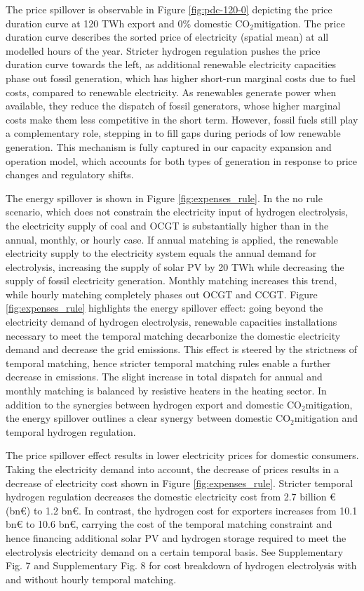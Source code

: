 \documentclass[5p,numafflabel]{elsarticle}
\newcommand{\co}{\ce{CO2}~}
\def\co{CO${}_2${\:}}
\begin{document}
The price spillover is observable in Figure \ref{fig:pdc-120-0} depicting the price duration curve at 120 TWh export and 0\% domestic \co mitigation. The price duration curve describes the sorted price of electricity (spatial mean) at all modelled hours of the year.
Stricter hydrogen regulation pushes the price duration curve towards the left, as additional renewable electricity capacities phase out fossil generation, which has higher short-run marginal costs due to fuel costs, compared to renewable electricity.
As renewables generate power when available, they reduce the dispatch of fossil generators, whose higher marginal costs make them less competitive in the short term. However, fossil fuels still play a complementary role, stepping in to fill gaps during periods of low renewable generation. This mechanism is fully captured in our capacity expansion and operation model, which accounts for both types of generation in response to price changes and regulatory shifts.


The energy spillover is shown in Figure \ref{fig:expenses_rule}. In the no rule scenario, which does not constrain the electricity input of hydrogen electrolysis, the electricity supply of coal and OCGT is substantially higher than in the annual, monthly, or hourly case. If annual matching is applied, the renewable electricity supply to the electricity system equals the annual demand for electrolysis, increasing the supply of solar PV by 20 TWh while decreasing the supply of fossil electricity generation. 
Monthly matching increases this trend, while hourly matching completely phases out OCGT and CCGT. Figure \ref{fig:expenses_rule} highlights the energy spillover effect: going beyond the electricity demand of hydrogen electrolysis, renewable capacities installations necessary to meet the temporal matching decarbonize the domestic electricity demand and decrease the grid emissions. This effect is steered by the strictness of temporal matching, hence stricter temporal matching rules enable a further decrease in emissions.
The slight increase in total dispatch for annual and monthly matching is balanced by resistive heaters in the heating sector.
In addition to the synergies between hydrogen export and domestic \co mitigation, the energy spillover outlines a clear synergy between domestic \co mitigation and temporal hydrogen regulation.



The price spillover effect results in lower electricity prices for domestic consumers. Taking the electricity demand into account, the decrease of prices results in a decrease of electricity cost shown in 
Figure \ref{fig:expenses_rule}. Stricter temporal hydrogen regulation decreases the domestic electricity cost from 2.7 billion € (bn€) to 1.2 bn€. In contrast, the hydrogen cost for exporters increases from 10.1 bn€ to 10.6 bn€, carrying the cost of the temporal matching constraint and hence financing additional solar PV and hydrogen storage required to meet the electrolysis electricity demand on a certain temporal basis. See Supplementary Fig. 7 and Supplementary Fig. 8 for cost breakdown of hydrogen electrolysis with and without hourly temporal matching. %
\end{document}
